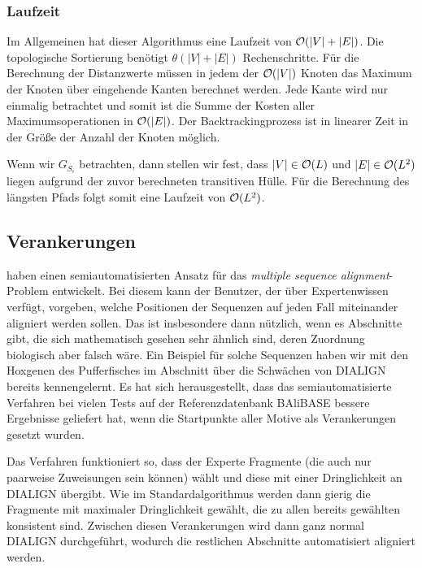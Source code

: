 \subsubsection{Laufzeit}

Im Allgemeinen hat dieser Algorithmus eine Laufzeit von $\mathcal{O}(|V| + |E|)$. Die topologische Sortierung benötigt $\theta(|V| + |E|)$ Rechenschritte. Für die Berechnung der Distanzwerte müssen in jedem der $\mathcal{O}(|V|)$ Knoten das Maximum der Knoten über eingehende Kanten berechnet werden. Jede Kante wird nur einmalig betrachtet und somit ist die Summe der Kosten aller Maximumsoperationen in $\mathcal{O}(|E|)$. Der Backtrackingprozess ist in linearer Zeit in der Größe der Anzahl der Knoten möglich.

Wenn wir $G_{S_i}$ betrachten, dann stellen wir fest, dass $|V| \in \mathcal{O}(L)$ und $|E| \in \mathcal{O}(L^2)$ liegen aufgrund der zuvor berechneten transitiven Hülle. Für die Berechnung des längsten Pfads folgt somit eine Laufzeit von $\mathcal{O}(L^2)$.

\subsection{Verankerungen}

\cite{mpps06} haben einen semiautomatisierten Ansatz für das \emph{multiple sequence alignment}-Problem entwickelt. Bei diesem kann der Benutzer, der über Expertenwissen verfügt, vorgeben, welche Positionen der Sequenzen auf jeden Fall miteinander aligniert werden sollen. Das ist insbesondere dann nützlich, wenn es Abschnitte gibt, die sich mathematisch gesehen sehr ähnlich sind, deren Zuordnung biologisch aber falsch wäre. Ein Beispiel für solche Sequenzen haben wir mit den Hoxgenen des Pufferfisches im Abschnitt über die Schwächen von DIALIGN bereits kennengelernt. Es hat sich herausgestellt, dass das semiautomatisierte Verfahren bei vielen Tests auf der Referenzdatenbank BAliBASE bessere Ergebnisse geliefert hat, wenn die Startpunkte aller Motive als Verankerungen gesetzt wurden.

Das Verfahren funktioniert so, dass der Experte Fragmente (die auch nur paarweise Zuweisungen sein können) wählt und diese mit einer Dringlichkeit an DIALIGN übergibt. Wie im Standardalgorithmus werden dann gierig die Fragmente mit maximaler Dringlichkeit gewählt, die zu allen bereits gewählten konsistent sind. Zwischen diesen Verankerungen wird dann ganz normal DIALIGN durchgeführt, wodurch die restlichen Abschnitte automatisiert aligniert werden.

